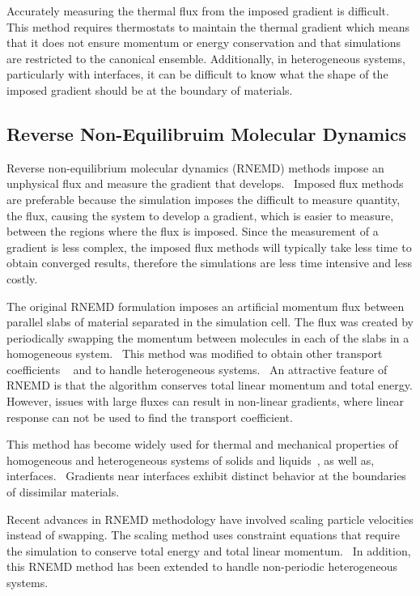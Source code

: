 Accurately measuring the thermal flux from the imposed gradient is difficult.
This method requires thermostats to maintain the thermal gradient which means that it does not ensure momentum or energy conservation and that simulations are restricted to the canonical ensemble.
Additionally, in heterogeneous systems, particularly with interfaces, it can be difficult to know what the shape of the imposed gradient should be at the boundary of materials.

\subsection{Reverse Non-Equilibruim Molecular Dynamics}
Reverse non-equilibrium molecular dynamics (RNEMD) methods impose an unphysical flux and measure the gradient that develops.~\cite{Muller-Plathe:1997wq,Muller-Plathe:1999ao,Kuang:2012fe}
Imposed flux methods are preferable because the simulation imposes the difficult to measure quantity, the flux, causing the system to develop a gradient, which is easier to measure, between the regions where the flux is imposed. 
Since the measurement of a gradient is less complex, the imposed flux methods will typically take less time to obtain converged results, therefore the simulations are less time intensive and less costly.

The original RNEMD formulation imposes an artificial momentum flux between parallel slabs of material separated in the simulation cell. The flux was created by periodically swapping the momentum between molecules in each of the slabs in a homogeneous system.~\cite{Muller-Plathe:1997wq} 
This method was modified to obtain other transport coefficients ~\cite{Muller-Plathe:1999ao} and to handle heterogeneous systems.~\cite{Muller-plathe:2005} 
An attractive feature of RNEMD is that the algorithm conserves total linear momentum and total energy.
However, issues with large fluxes can result in non-linear gradients, where linear response can not be used to find the transport coefficient.~\cite{Tenney:2010rp}

This method has become widely used for thermal and mechanical properties of homogeneous and heterogeneous systems of solids and liquids~\cite{Muller-Plathe:1997wq,Muller-Plathe:1999ao, Tenney:2010rp}, as well as, interfaces.~\cite{Patel:2005zm, Shenogina:2009ix,Kuang:2011ef, Stocker:2013cl}
Gradients near interfaces exhibit distinct behavior at the boundaries of dissimilar materials.

Recent advances in RNEMD methodology have involved scaling particle velocities instead of swapping. The scaling method uses constraint equations that require the simulation to conserve total energy and total linear momentum.~\cite{Kuang:2011ef, Kuang:2012fe}
In addition, this RNEMD method has been extended to handle non-periodic heterogeneous systems.~\cite{Stocker:2014qq}

